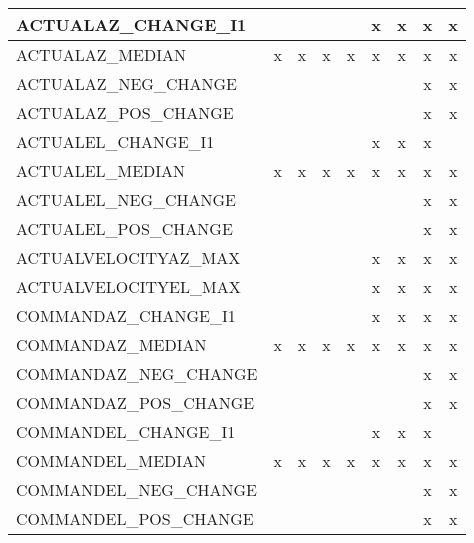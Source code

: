\begin{longtable}{|lcccccccc|}
    \endlastfoot
    ACTUALAZ\_CHANGE\_I1 &        &        &        &        &      x &      x &      x &      x \\ \hline
    ACTUALAZ\_MEDIAN &      x &      x &      x &      x &      x &      x &      x &      x \\ \hline
    ACTUALAZ\_NEG\_CHANGE &        &        &        &        &        &        &      x &      x \\ \hline
    ACTUALAZ\_POS\_CHANGE &        &        &        &        &        &        &      x &      x \\ \hline
    ACTUALEL\_CHANGE\_I1 &        &        &        &        &      x &      x &      x &        \\ \hline
    ACTUALEL\_MEDIAN &      x &      x &      x &      x &      x &      x &      x &      x \\ \hline
    ACTUALEL\_NEG\_CHANGE &        &        &        &        &        &        &      x &      x \\ \hline
    ACTUALEL\_POS\_CHANGE &        &        &        &        &        &        &      x &      x \\ \hline
    ACTUALVELOCITYAZ\_MAX &        &        &        &        &      x &      x &      x &      x \\ \hline
    ACTUALVELOCITYEL\_MAX &        &        &        &        &      x &      x &      x &      x \\ \hline
    COMMANDAZ\_CHANGE\_I1 &        &        &        &        &      x &      x &      x &      x \\ \hline
    COMMANDAZ\_MEDIAN &      x &      x &      x &      x &      x &      x &      x &      x \\ \hline
    COMMANDAZ\_NEG\_CHANGE &        &        &        &        &        &        &      x &      x \\ \hline
    COMMANDAZ\_POS\_CHANGE &        &        &        &        &        &        &      x &      x \\ \hline
    COMMANDEL\_CHANGE\_I1 &        &        &        &        &      x &      x &      x &        \\ \hline
    COMMANDEL\_MEDIAN &      x &      x &      x &      x &      x &      x &      x &      x \\ \hline
    COMMANDEL\_NEG\_CHANGE &        &        &        &        &        &        &      x &      x \\ \hline
    COMMANDEL\_POS\_CHANGE &        &        &        &        &        &        &      x &      x \\ \hline

\end{longtable}
